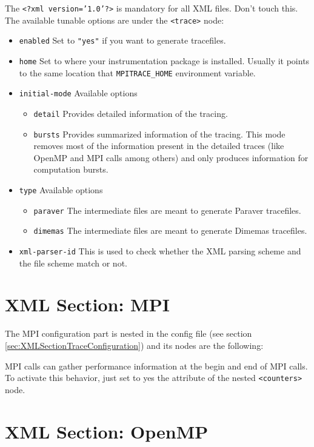The {\tt <?xml version='1.0'?>} is mandatory for all XML files. Don't touch this. The available tunable options are under the {\tt <trace>} node:
\begin{itemize}
 \item {\tt enabled} Set to {\tt "yes"} if you want to generate tracefiles.
 \item {\tt home} Set to where your instrumentation package is installed. Usually it points to the same location that {\tt MPITRACE\_HOME} environment variable.
 \item {\tt initial-mode} Available options
  \begin{itemize}
   \item {\tt detail} Provides detailed information of the tracing.
   \item {\tt bursts} Provides summarized information of the tracing. This mode removes most of the information present in the detailed traces (like OpenMP and MPI calls among others) and only produces information for computation bursts.
  \end{itemize} 
 \item {\tt type} Available options
  \begin{itemize}
   \item {\tt paraver} The intermediate files are meant to generate Paraver tracefiles.
   \item {\tt dimemas} The intermediate files are meant to generate Dimemas tracefiles.
  \end{itemize}
 \item {\tt xml-parser-id} This is used to check whether the XML parsing scheme and the file scheme match or not.
\end{itemize}

\section{XML Section: MPI}\label{sec:XMLSectionMPI}

The MPI configuration part is nested in the config file (see section \ref{sec:XMLSectionTraceConfiguration}) and its nodes are the following:



MPI calls can gather performance information at the begin and end of MPI calls. To activate this behavior, just set to yes the attribute of the nested {\tt <counters>} node.

\section{XML Section: OpenMP}\label{sec:XMLSectionOpenMP}

